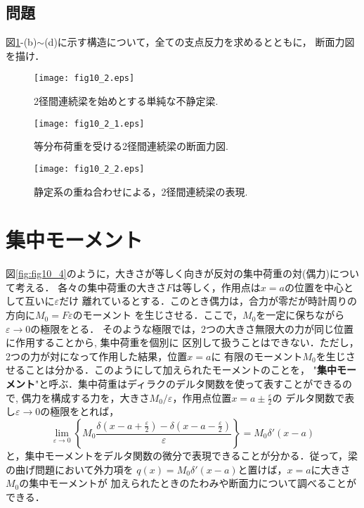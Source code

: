 \documentclass[10pt,a4j]{jbook}
\begin{document}
\subsection{問題}
図\ref{fig:fig10_2}-(b)$\sim$(d)に示す構造について，全ての支点反力を求めるとともに，
断面力図を描け．
\begin{figure}[h]
	\begin{center}
	\texttt{[image: fig10\_2.eps]} 
	\end{center}
	\caption{
		2径間連続梁を始めとする単純な不静定梁.
	} 
	\label{fig:fig10_2}
\end{figure}
\begin{figure}[h]
	\begin{center}
	\texttt{[image: fig10\_2\_1.eps]} 
	\end{center}
	\caption{
		等分布荷重を受ける2径間連続梁の断面力図.
	} 
	\label{fig:fig10_2_1}
\end{figure}
\begin{figure}[h]
	\begin{center}
	\texttt{[image: fig10\_2\_2.eps]} 
	\end{center}
	\caption{
		静定系の重ね合わせによる，2径間連続梁の表現.
	} 
	\label{fig:fig10_2_2}
\end{figure}
\section{集中モーメント}
図\ref{fig:fig10_4}のように，大きさが等しく向きが反対の集中荷重の対(偶力)について考える．
各々の集中荷重の大きさ$F$は等しく，作用点は$x=a$の位置を中心として互いに$\varepsilon$だけ
離れているとする．このとき偶力は，合力が零だが時計周りの方向に$M_0=F\varepsilon$のモーメント
を生じさせる．ここで，$M_0$を一定に保ちながら$\varepsilon \rightarrow 0$の極限をとる．
そのような極限では，2つの大きさ無限大の力が同じ位置に作用することから, 集中荷重を個別に
区別して扱うことはできない．ただし，2つの力が対になって作用した結果，位置$x=a$に
有限のモーメント$M_0$を生じさせることは分かる．このようにして加えられたモーメントのことを，
"{\bf 集中モーメント}"と呼ぶ．集中荷重はディラクのデルタ関数を使って表すことができるので, 
偶力を構成する力を，大きさ$M_0/\varepsilon$，作用点位置$x=a\pm\frac{\varepsilon}{2}$の
デルタ関数で表し$\varepsilon \rightarrow 0$の極限をとれば，
\begin{equation}
	\lim_{\varepsilon \rightarrow 0} 
	\left\{
	M_0\frac{
		\delta\left(x-a+\frac{\varepsilon}{2}\right)
		-
		\delta\left(x-a-\frac{\varepsilon}{2}\right)
	}{\varepsilon}
	\right\}
	=M_0 \delta '\left( x-a \right)
\end{equation}
と，集中モーメントをデルタ関数の微分で表現できることが分かる．従って，梁の曲げ問題において外力項を
$q(x)=M_0\delta'\left(x-a\right)$と置けば，$x=a$に大きさ$M_0$の集中モーメントが
加えられたときのたわみや断面力について調べることができる．
\end{document}

